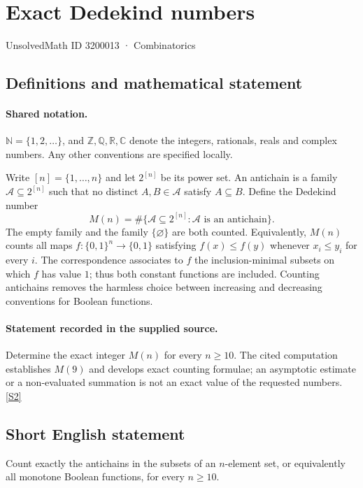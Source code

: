 \documentclass[11pt]{article}
\newcommand{\sref}[2]{\hyperlink{source:#1:#2}{[S#2]}}
\begin{document}
\setcounter{section}{3200012}
\section{Exact Dedekind numbers}\label{3200013}
{\small\sffamily UnsolvedMath ID 3200013 · Combinatorics}
\subsection{Definitions and mathematical statement}

\paragraph{Shared notation.}$\mathbb N=\{1,2,\ldots\}$, and $\mathbb Z,\mathbb Q,\mathbb R,\mathbb C$ denote the integers, rationals, reals and complex numbers. Any other conventions are specified locally.


Write $[n]=\{1,\ldots,n\}$ and let $2^{[n]}$ be its power set. An antichain is a family $\mathcal A\subseteq2^{[n]}$ such that no distinct $A,B\in\mathcal A$ satisfy $A\subseteq B$. Define the Dedekind number
\[
M(n)=\#\{\mathcal A\subseteq2^{[n]}:\mathcal A\text{ is an antichain}\}.
\]
The empty family and the family $\{\varnothing\}$ are both counted. Equivalently, $M(n)$ counts all maps $f:\{0,1\}^n\to\{0,1\}$ satisfying $f(x)\le f(y)$ whenever $x_i\le y_i$ for every $i$. The correspondence associates to $f$ the inclusion-minimal subsets on which $f$ has value $1$; thus both constant functions are included. Counting antichains removes the harmless choice between increasing and decreasing conventions for Boolean functions.
\paragraph{Statement recorded in the supplied source.}
Determine the exact integer $M(n)$ for every $n\ge10$. The cited computation establishes $M(9)$ and develops exact counting formulae; an asymptotic estimate or a non-evaluated summation is not an exact value of the requested numbers. \sref{3200013}{2}
\subsection{Short English statement}
Count exactly the antichains in the subsets of an $n$-element set, or equivalently all monotone Boolean functions, for every $n\ge10$.
\end{document}

